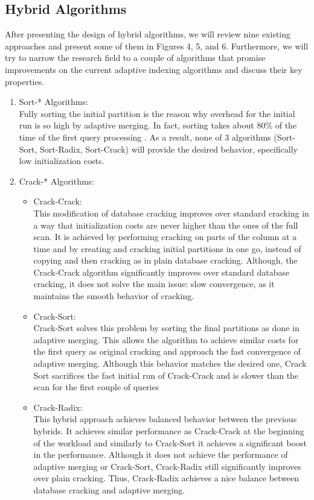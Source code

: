 \documentclass[10pt, conference, compsocconf]{IEEEtran}
\begin{document}
\subsection{Hybrid Algorithms}
\label{subsec:hybrid_algo}
After presenting the design of hybrid algorithms, we will review nine existing approaches and present some of them in Figures 4, 5, and 6. Furthermore, we will try to narrow the research field to a couple of algorithms that promise improvements on the current adaptive indexing algorithms and discuss their key properties.
\begin{enumerate}
\item{Sort-* Algorithms:} \\
Fully sorting the initial partition is the reason why overhead for the initial run is so high by adaptive merging. In fact, sorting takes about 80\% of the time of the first query processing \cite{hybrid}. As a result, none of 3 algorithms (Sort-Sort, Sort-Radix, Sort-Crack) will provide the desired behavior, specifically low initialization costs.\\

\item{Crack-* Algorithms:}
\begin{itemize}
\item{Crack-Crack:}\\
This modification of database cracking improves over standard cracking in a way that initialization costs are never higher than the ones of the full scan. It is achieved by performing cracking on parts of the column at a time and by creating and cracking initial partitions in one go, instead of copying and then cracking as in plain database cracking. Although, the Crack-Crack algorithm significantly improves over standard database cracking, it does not solve the main issue: slow convergence, as it maintains the smooth behavior of cracking.\\
\item{Crack-Sort:}\\
Crack-Sort solves this problem by sorting the final partitions as done in adaptive merging. This allows the algorithm to achieve similar costs for the first query as original cracking and approach the fast convergence of adaptive merging. Although this behavior matches the desired one, Crack Sort sacrifices the fast initial run of Crack-Crack and is slower than the scan for the first couple of queries\\
\item{Crack-Radix:}\\
This hybrid approach achieves balanced behavior between the previous hybrids. It achieves similar performance as Crack-Crack at the beginning of the workload and similarly to Crack-Sort it achieves a significant boost in the performance. Although it does not achieve the performance of adaptive merging or Crack-Sort, Crack-Radix still significantly improves over plain cracking. Thus, Crack-Radix achieves a nice balance between database cracking and adaptive merging.\\
\end{itemize}


\end{enumerate}
\end{document}
